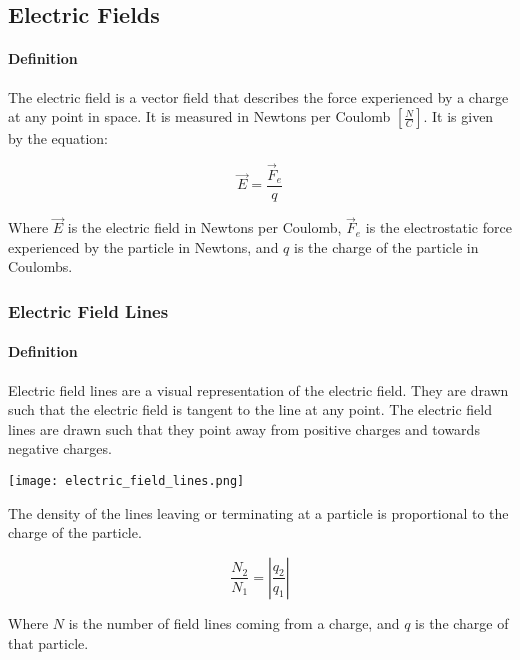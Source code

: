 \subsection{Electric Fields}
\hrulefill

\paragraph*{Definition}
The electric field is a vector field that describes the force experienced by a charge at any point in space. 
It is measured in Newtons per Coulomb $[\frac{N}{C}]$. It is given by the equation:

\begin{equation*}
    \vec{E} = \frac{\vec{F}_e}{q}
\end{equation*}

Where $\vec{E}$ is the electric field in Newtons per Coulomb, $\vec{F}_e$ is the electrostatic force experienced by the
particle in Newtons, and $q$ is the charge of the particle in Coulombs.\\

\subsubsection*{Electric Field Lines}

\paragraph*{Definition}
Electric field lines are a visual representation of the electric field. They are drawn such that the electric field is tangent to the line at any point. 
The electric field lines are drawn such that they point away from positive charges and towards negative charges.

\begin{center}
    \texttt{[image: electric\_field\_lines.png]}
\end{center}


The density of the lines leaving or terminating at a particle is proportional to the charge of the particle.

\begin{equation*}
    \frac{N_2}{N_1} = |\frac{q_2}{q_1}|
\end{equation*}

Where $N$ is the number of field lines coming from a charge, and $q$ is the charge of that particle.\\

